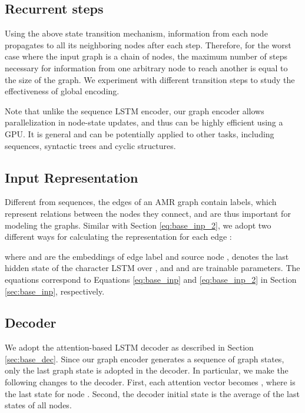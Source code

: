 \documentclass[11pt,a4paper]{article}
\begin{document}
\subsection{Recurrent steps}

Using the above state transition mechanism, information from each node propagates to all its neighboring nodes after each step. 
Therefore, for the worst case where the input graph is a chain of nodes, the maximum number of steps necessary for information from one arbitrary node to reach another is equal to the size of the graph. 
We experiment with different transition steps to study the effectiveness of global encoding. 

Note that unlike the sequence LSTM encoder, our graph encoder allows parallelization in node-state updates, and thus can be highly efficient using a GPU\@.
It is general and can be potentially applied to other tasks, including sequences, syntactic trees and cyclic structures. 

\subsection{Input Representation}
\label{sec:input}

Different from sequences, the edges of an AMR graph contain labels, which represent relations between the nodes they connect, and are thus important for modeling the graphs.
Similar with Section \ref{eq:base_inp_2}, we adopt two different ways for calculating the representation for each edge : 

where  and  are the embeddings of edge label  and source node ,  denotes the last hidden state of the character LSTM over , and  and  are trainable parameters.
The equations correspond to Equations \ref{eq:base_inp} and \ref{eq:base_inp_2} in Section \ref{sec:base_inp}, respectively.




\subsection{Decoder}



We adopt the attention-based LSTM decoder as described in Section \ref{sec:base_dec}.
Since our graph encoder generates a sequence of graph states, only the last graph state is adopted in the decoder.
In particular, we make the following changes to the decoder. First, each attention vector becomes , where  is the last state for node . 
Second, the decoder initial state  is the average of the last states of all nodes.
\end{document}

